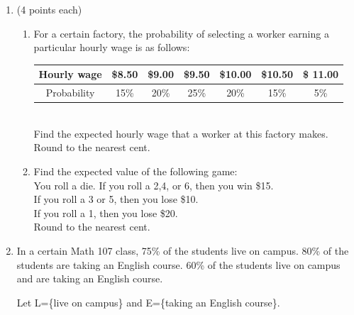 \documentclass[12pt]{article}
\begin{document}
\begin{enumerate}
\begin{enumerate}
\item
all five are blue

\vspace{.6 in}



\item
exactly four are blue

\vspace{.6 in}

\item
at least four are blue

\vspace{.4 in}
\end{enumerate}

\newpage
\item (4 points each)
\begin{enumerate}
\item
For a certain factory, the probability of selecting a worker earning a particular hourly wage is as follows:

\begin{tabular}{|c|c|c|c|c|c|c|}
\hline
Hourly wage	& \$8.50 & \$9.00 & \$9.50 & \$10.00 & \$10.50 & \$ 11.00 \\
\hline
Probability & 15\% & 20\% & 25\% & 20\% & 15\% & 5\%\\
\hline
\end{tabular}
\\Find the expected hourly wage that a worker at this factory makes.  Round to the nearest cent.

\vspace{1.1 in}
\item Find the expected value of the following game:
\\You roll a die.  If you roll a 2,4, or 6, then you win \$15.
\\If you roll a 3 or 5, then you lose \$10.
\\If you roll a 1, then you lose \$20.
\\Round to the nearest cent.
\end{enumerate}
\vspace{1.1 in}

\item
In a certain Math 107 class, 75\% of the students live on campus.  80\% of the students are taking an English course.  60\% of the students live on campus and are taking an English course.

Let L=\{live on campus\} and E=\{taking an English course\}.


\end{enumerate}
\end{document}
